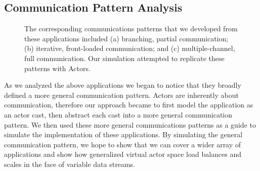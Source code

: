 \documentclass[conference,twocolumn,10pt]{IEEEtran}
\begin{document}
\subsection{Communication Pattern Analysis}

\begin{figure}[!t]
    \centering
    \hfil
    \hfil
    \caption{The corresponding communications patterns that we developed from these applications included (a) branching, partial communication; (b) iterative, front-loaded communication; and (c) multiple-channel, full communication. Our simulation attempted to replicate these patterns with Actors.}
    \label{fig:communications_patterns}
\end{figure}

As we analyzed the above applications we began to notice that they broadly defined a more general communication pattern. Actors are inherently about communication, therefore our approach became to first model the application as an actor cast, then abstract each cast into a more general communication pattern. We then used these more general communications patterns as a guide to simulate the implementation of these applications. By simulating the general communication pattern, we hope to show that we can cover a wider array of applications and show how generalized virtual actor space load balances and scales in the face of variable data streams.
\end{document}
